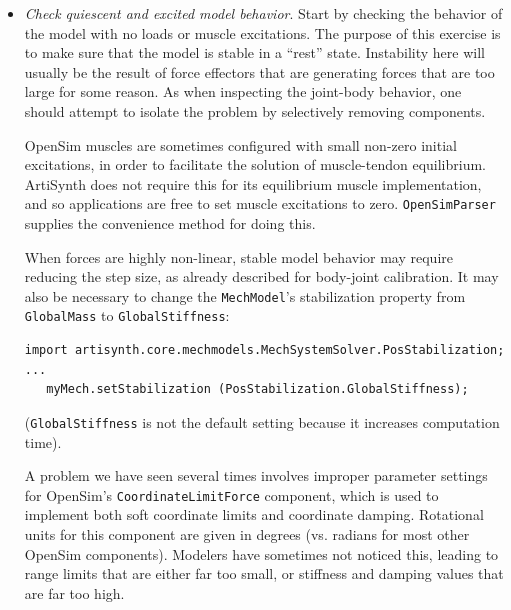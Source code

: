 \begin{itemize}
\item {\it Check quiescent and excited model behavior}. Start by checking the
behavior of the model with no loads or muscle excitations.  The purpose of this
exercise is to make sure that the model is stable in a ``rest''
state. Instability here will usually be the result of force effectors that are
generating forces that are too large for some reason. As when inspecting the
joint-body behavior, one should attempt to isolate the problem by selectively
removing components.

\begin{sideblock}
OpenSim muscles are sometimes configured with small non-zero initial
excitations, in order to facilitate the solution of muscle-tendon equilibrium.
ArtiSynth does not require this for its equilibrium muscle implementation, and
so applications are free to set muscle excitations to zero. {\tt OpenSimParser}
supplies the convenience method
 for doing this.
\end{sideblock}

When forces are highly non-linear, stable model behavior may require reducing
the step size, as already described for body-joint calibration. It may also be
necessary to change the {\tt MechModel}'s {\sf stabilization} property from
{\tt GlobalMass} to {\tt GlobalStiffness}:
%
\begin{lstlisting}[]
import artisynth.core.mechmodels.MechSystemSolver.PosStabilization;
...
   myMech.setStabilization (PosStabilization.GlobalStiffness);
\end{lstlisting}
%
({\tt GlobalStiffness} is not the default setting because it increases
computation time).

\begin{sideblock}
A problem we have seen several times involves improper parameter settings for
OpenSim's {\tt CoordinateLimitForce} component, which is used to implement both
soft coordinate limits and coordinate damping. Rotational units for this
component are given in degrees (vs. radians for most other OpenSim components).
Modelers have sometimes not noticed this, leading to range limits that are
either far too small, or stiffness and damping values that are far too high.
\end{sideblock}


\end{itemize}
